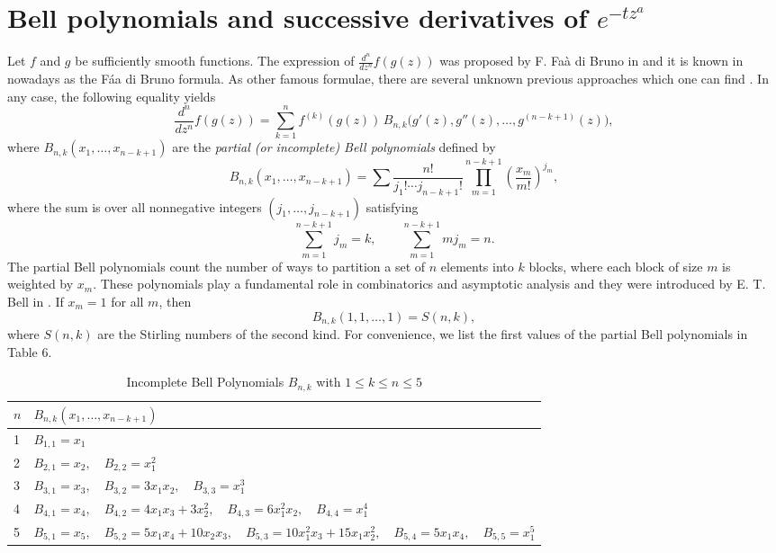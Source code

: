 \documentclass[a4paper,12pt]{amsart}
\theoremstyle{definition}
\theoremstyle{remark}
\begin{document}
\section{Bell polynomials and successive derivatives of $e^{-t z^{a}}$}

Let \(f\) and \(g\) be sufficiently smooth functions. The expression of $\frac{d^n}{dz^n} f(g(z))$ was proposed by F. Faà di Bruno in \cite{Faa} and it is  known in nowadays as the Fáa di Bruno formula. As other famous formulae,  there are several unknown previous approaches which one can find \cite{johnson}. In any case, the following equality yields
\begin{equation}\label{Faa}
\frac{d^n}{dz^n} f(g(z))
=
\sum_{k=1}^n
f^{(k)}(g(z))\,
B_{n,k}\!\big(g'(z), g''(z), \dots, g^{(n-k+1)}(z)\big),
\end{equation}
where
\(B_{n,k}(x_1,\dots,x_{n-k+1})\) are
the \emph{partial (or incomplete) Bell polynomials} defined by
\[
B_{n,k}(x_1,\dots,x_{n-k+1})
=
\sum
\frac{n!}{j_1!\cdots j_{n-k+1}!}
\prod_{m=1}^{n-k+1}
\left( \frac{x_m}{m!} \right)^{j_m},
\]
where the sum is over all nonnegative integers
\((j_1,\dots,j_{n-k+1})\) satisfying
\[
\sum_{m=1}^{n-k+1} j_m = k,
\qquad
\sum_{m=1}^{n-k+1} m j_m = n.
\]
The partial Bell polynomials count the number of ways to partition a set
of \(n\) elements into \(k\) blocks, where each block of size \(m\) is weighted
by \(x_m\).
These polynomials play a fundamental role in combinatorics and asymptotic
analysis and they were introduced by E. T. Bell in \cite{B}. If \(x_m = 1\) for all \(m\), then
\[
B_{n,k}(1,1,\dots,1) = S(n,k),
\]
where \(S(n,k)\) are the Stirling numbers of the second kind. For convenience, we list the first values of the partial Bell
polynomials in Table 6.

\begin{table}[h]
\centering
\small
\begin{tabular}{l|l}
$n$ &  $B_{n,k}(x_1, \dots, x_{n-k+1})$  \\ \hline
1 & $B_{1,1} = x_1$ \\
2 & $B_{2,1} = x_2, \quad B_{2,2} = x_1^2$ \\
3 & $B_{3,1} = x_3, \quad B_{3,2} = 3x_1x_2, \quad B_{3,3} = x_1^3$ \\
4 & $B_{4,1} = x_4, \quad B_{4,2} = 4x_1x_3 + 3x_2^2, \quad B_{4,3} = 6x_1^2x_2, \quad B_{4,4} = x_1^4$ \\
5 & $B_{5,1} = x_5, \quad B_{5,2} = 5x_1x_4 + 10x_2x_3, \quad B_{5,3} = 10x_1^2x_3 + 15x_1x_2^2, \quad B_{5,4}= 5x_1x_4,\quad B_{5,5} = x_1^5$ \\
\end{tabular}
\vspace{2pt}
\caption{Incomplete Bell Polynomials $B_{n,k}$ with $1\le k\le n\le 5$}
\end{table}
\end{document}
